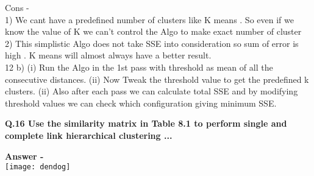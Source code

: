 \documentclass[5pt]{article}
\begin{document}
Cons - \\

1) We cant have a predefined number of clusters like K means . So even if we know the value of K we can't control the Algo to make exact number of cluster \\
2) This simplistic Algo does not take SSE into consideration so sum of error is high . K means will almost always have a better result. \\

12 b) 
(i) Run the Algo in the 1st pass with threshold as mean of all the consecutive distances.
(ii) Now Tweak the threshold value to get the predefined k clusters.
(ii) Also after each pass we can calculate total SSE and by modifying threshold values we can check which configuration giving minimum SSE.

\textbf{Q.16   Use the similarity matrix in Table 8.1 to perform single and complete link hierarchical clustering ... }

\setlength{\parskip}{1.2em}
\setlength{\parindent}{0em}

\textbf{Answer -} \\
\texttt{[image: dendog]} \\
\end{document}
